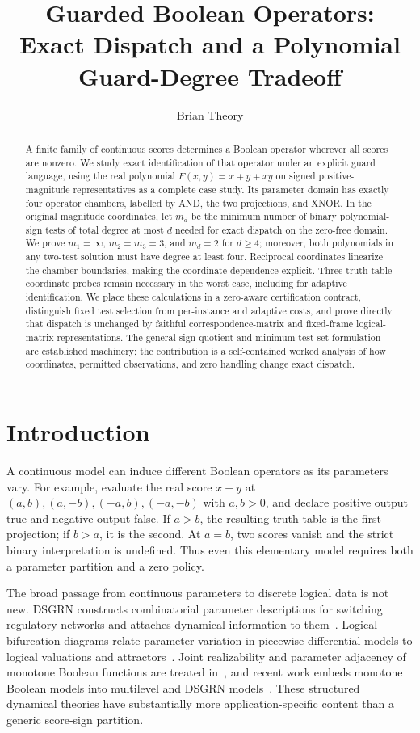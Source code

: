 \documentclass[11pt]{article}
\title{\textbf{Guarded Boolean Operators:\\Exact Dispatch and a Polynomial Guard-Degree Tradeoff}}
\author{Brian Theory}
\date{}
\theoremstyle{definition}
\theoremstyle{remark}
\begin{document}
\maketitle
\begin{abstract}
A finite family of continuous scores determines a Boolean operator wherever all scores are nonzero. We study exact identification of that operator under an explicit guard language, using the real polynomial $F(x,y)=x+y+xy$ on signed positive-magnitude representatives as a complete case study. Its parameter domain has exactly four operator chambers, labelled by AND, the two projections, and XNOR. In the original magnitude coordinates, let $m_d$ be the minimum number of binary polynomial-sign tests of total degree at most $d$ needed for exact dispatch on the zero-free domain. We prove $m_1=\infty$, $m_2=m_3=3$, and $m_d=2$ for $d\ge4$; moreover, both polynomials in any two-test solution must have degree at least four. Reciprocal coordinates linearize the chamber boundaries, making the coordinate dependence explicit. Three truth-table coordinate probes remain necessary in the worst case, including for adaptive identification. We place these calculations in a zero-aware certification contract, distinguish fixed test selection from per-instance and adaptive costs, and prove directly that dispatch is unchanged by faithful correspondence-matrix and fixed-frame logical-matrix representations. The general sign quotient and minimum-test-set formulation are established machinery; the contribution is a self-contained worked analysis of how coordinates, permitted observations, and zero handling change exact dispatch.
\end{abstract}

\section{Introduction}

A continuous model can induce different Boolean operators as its parameters vary. For example, evaluate the real score $x+y$ at $(a,b),(a,-b),(-a,b),(-a,-b)$ with $a,b>0$, and declare positive output true and negative output false. If $a>b$, the resulting truth table is the first projection; if $b>a$, it is the second. At $a=b$, two scores vanish and the strict binary interpretation is undefined. Thus even this elementary model requires both a parameter partition and a zero policy.

The broad passage from continuous parameters to discrete logical data is not new. DSGRN constructs combinatorial parameter descriptions for switching regulatory networks and attaches dynamical information to them~\cite{Cummins2016,Cummins2018,Gedeon2020}. Logical bifurcation diagrams relate parameter variation in piecewise differential models to logical valuations and attractors~\cite{AbouJaoude2019}. Joint realizability and parameter adjacency of monotone Boolean functions are treated in~\cite{Crawford2022}, and recent work embeds monotone Boolean models into multilevel and DSGRN models~\cite{Cummins2026}. These structured dynamical theories have substantially more application-specific content than a generic score-sign partition.
\end{document}
